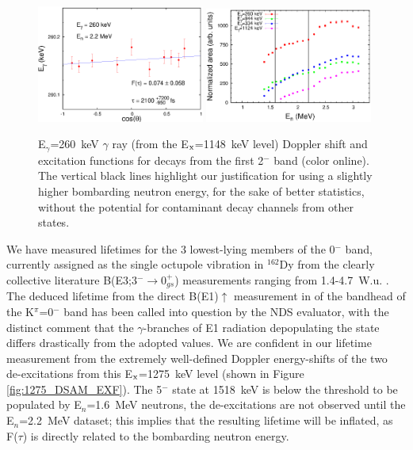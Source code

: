 \begin{figure}[h!]
\begin{center}
\includegraphics[width=0.49\textwidth]{figures/260_DSAM.eps}
\includegraphics[width=0.49\textwidth]{figures/260_ExF.eps}
\caption{E$_\gamma$=260~keV $\gamma$ ray (from the E$_{\rm x}$=1148~keV level) Doppler shift and excitation functions for decays from the first 2$^-$ band (color online). The vertical black lines highlight our justification for using a slightly higher bombarding neutron energy, for the sake of better statistics, without the potential for contaminant decay channels from other states. \label{fig:260_DSAM_EXF}}
\end{center}
\end{figure}

We have measured lifetimes for the 3 lowest-lying members of the 0$^-$ band, currently assigned as the single octupole vibration in $^{162}$Dy from the clearly collective literature B(E3;3$^-\rightarrow$0$^+_{gs}$) measurements ranging from 1.4-4.7~W.u. \cite{KORTEN_1993,OEHLBERG_BE3}. The deduced lifetime from the direct B(E1)$\uparrow$ measurement in \cite{Zilges_K0dipole} of the bandhead of the K$^\pi$=0$^-$ band has been called into question by the NDS evaluator, with the distinct comment that the $\gamma$-branches of E1 radiation depopulating the state differs drastically from the adopted values. We are confident in our lifetime measurement from the extremely well-defined Doppler energy-shifts of the two de-excitations from this E$_{\rm x}$=1275~keV level (shown in Figure \ref{fig:1275_DSAM_EXF}). The 5$^-$ state at 1518~keV is below the threshold to be populated by E$_n$=1.6~MeV neutrons, the de-excitations are not observed until the E$_n$=2.2~MeV dataset; this implies that the resulting lifetime will be inflated, as F($\tau$) is directly related to the bombarding neutron energy.

